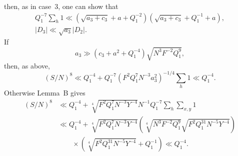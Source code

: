 \documentclass[10pt]{article}
\begin{document}
then, as in case~3, one can show that
\[
\begin{gathered}
 Q_1^{-7}\sum_h1\ll
 (\sqrt{a_3+c_3}+a+Q_1^{-2})
 (\sqrt{a_3+c_3}+Q_1^{-1}+a),\\
 \lvert D_3\rvert\ll\sqrt{a_3}\lvert D_2\rvert.
\end{gathered}
\]
If
\[
  a_3\gg(c_3+a^2+Q_1^{-4})\sqrt{N^3F^{-2}Q_1^9},
\]
then, as above,
\[
  (S/N)^8\ll Q_1^{-4}
  +Q_1^{-7}(F^2Q_1^7N^{-3}a_3^2)^{-1/4}\sum_h1
  \ll Q_1^{-4}.
\]
Otherwise Lemma~B gives
\[
\begin{aligned}
(S/N)^8
&\ll Q_1^{-4}
 +\sqrt[4]{F^2Q_1^7N^{-3}Y^{-4}}
  N^{-1}Q_1^{-7}\sum_h\sum_{x,y}1\\
&\ll Q_1^{-4}
 +\sqrt[4]{F^2Q_1^7N^{-3}Y^{-4}}
 \left(\sqrt[4]{N^3F^{-2}Q_1^9}
       \sqrt{F^2Q_1^{31}N^{-5}Y^{-4}}\right)\\
&\qquad\times
 \left(\sqrt[4]{F^2Q_1^{31}N^{-5}Y^{-4}}+Q_1^{-1}\right)
 \ll Q_1^{-4}.
\end{aligned}
\]
\end{document}
